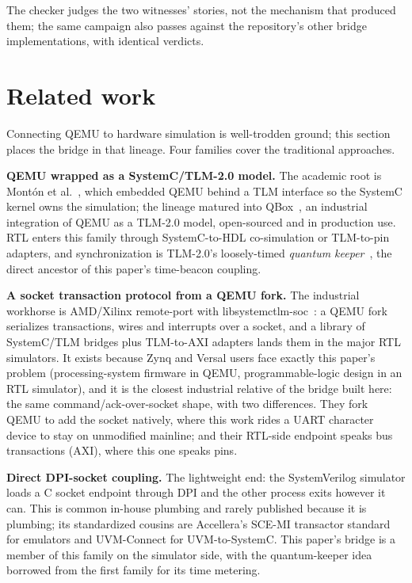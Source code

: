 \documentclass[11pt]{article}
\begin{document}
The checker judges the two witnesses' stories, not the mechanism
that produced them; the same campaign also passes against the
repository's other bridge implementations, with identical
verdicts.

\section{Related work}
\label{sec:related}

Connecting QEMU to hardware simulation is well-trodden ground; this
section places the bridge in that lineage.  Four families cover the
traditional approaches.

\textbf{QEMU wrapped as a SystemC/TLM-2.0 model.}  The academic root
is Mont\'on et al.~\cite{monton2007}, which embedded QEMU behind a
TLM interface so the SystemC kernel owns the simulation; the lineage
matured into QBox~\cite{qbox2016}, an industrial integration of QEMU
as a TLM-2.0 model, open-sourced and in production use.  RTL enters
this family through SystemC-to-HDL co-simulation or TLM-to-pin
adapters, and synchronization is TLM-2.0's loosely-timed
\emph{quantum keeper}~\cite{tlm2}, the direct ancestor of this
paper's time-beacon coupling.

\textbf{A socket transaction protocol from a QEMU fork.}  The
industrial workhorse is AMD/Xilinx remote-port with
libsystemctlm-soc~\cite{remoteport}: a QEMU fork serializes
transactions, wires and interrupts over a socket, and a library of
SystemC/TLM bridges plus TLM-to-AXI adapters lands them in the major
RTL simulators.  It exists because Zynq and Versal users face
exactly this paper's problem (processing-system firmware in QEMU,
programmable-logic design in an RTL simulator), and it is the
closest industrial relative of the bridge built here: the same
command/ack-over-socket shape, with two differences.  They fork QEMU
to add the socket natively, where this work rides a UART character
device to stay on unmodified mainline; and their RTL-side endpoint
speaks bus transactions (AXI), where this one speaks pins.

\textbf{Direct DPI-socket coupling.}  The lightweight end: the
SystemVerilog simulator loads a C socket endpoint through DPI and
the other process exits however it can.  This is common in-house
plumbing and rarely published because it is plumbing; its
standardized cousins are Accellera's SCE-MI transactor
standard~\cite{scemi} for emulators and UVM-Connect for
UVM-to-SystemC.  This paper's bridge is a member of this family on
the simulator side, with the quantum-keeper idea borrowed from the
first family for its time metering.
\end{document}
